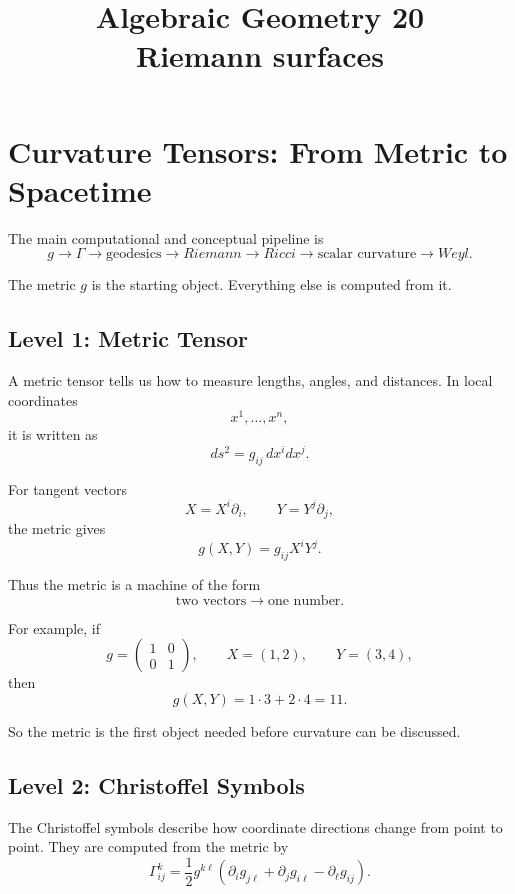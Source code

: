 \documentclass[12pt,a4paper]{article}
\theoremstyle{notespace}
\begin{document}
\title{Algebraic Geometry 20\\
	\large Riemann surfaces}
\author{}
\date{}

	\maketitle
	

	\setcounter{section}{0}

\tableofcontents

	\clearpage

\section{Curvature Tensors: From Metric to Spacetime}

The main computational and conceptual pipeline is
\[
g
\longrightarrow
\Gamma
\longrightarrow
\text{geodesics}
\longrightarrow
Riemann
\longrightarrow
Ricci
\longrightarrow
\text{scalar curvature}
\longrightarrow
Weyl.
\]

The metric \(g\) is the starting object. Everything else is computed from it.

\subsection{Level 1: Metric Tensor}

A metric tensor tells us how to measure lengths, angles, and distances. In local coordinates
\[
x^1,\dots,x^n,
\]
it is written as
\[
ds^2=g_{ij}\,dx^i dx^j.
\]

For tangent vectors
\[
X=X^i\partial_i,
\qquad
Y=Y^j\partial_j,
\]
the metric gives
\[
g(X,Y)=g_{ij}X^iY^j.
\]

Thus the metric is a machine of the form
\[
\boxed{
	\text{two vectors}\longrightarrow \text{one number}.
}
\]

For example, if
\[
g=
\begin{pmatrix}
	1&0\\
	0&1
\end{pmatrix},
\qquad
X=(1,2),
\qquad
Y=(3,4),
\]
then
\[
g(X,Y)=1\cdot 3+2\cdot 4=11.
\]

So the metric is the first object needed before curvature can be discussed.

\subsection{Level 2: Christoffel Symbols}

The Christoffel symbols describe how coordinate directions change from point to point. They are computed from the metric by
\[
\Gamma^k_{ij}
=
\frac12 g^{k\ell}
\left(
\partial_i g_{j\ell}
+
\partial_j g_{i\ell}
-
\partial_\ell g_{ij}
\right).
\]
\end{document}
